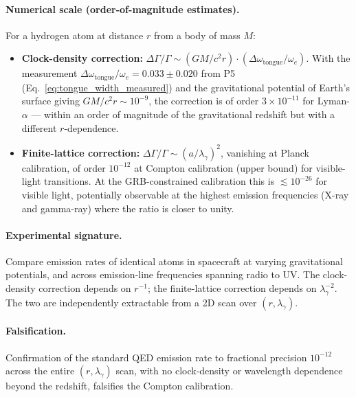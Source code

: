 \paragraph{Numerical scale (order-of-magnitude estimates).}
For a hydrogen atom at distance $r$ from a body of mass $M$:

\begin{itemize}
    \item \textbf{Clock-density correction:}
    $\Delta\Gamma/\Gamma \sim (GM/c^2 r) \cdot (\Delta\omega_\text{tongue}/\omega_e)$.
    With the measurement
    $\Delta\omega_\text{tongue}/\omega_e = 0.033 \pm 0.020$ from P5
    (Eq.~\ref{eq:tongue_width_measured}) and the gravitational
    potential of Earth's surface giving $GM/c^2 r \sim 10^{-9}$, the
    correction is of order $3 \times 10^{-11}$ for Lyman-$\alpha$ ---
    within an order of magnitude of the gravitational redshift but
    with a different $r$-dependence.
    \item \textbf{Finite-lattice correction:}
    $\Delta\Gamma/\Gamma \sim (a/\lambda_\gamma)^2$, vanishing at
    Planck calibration, of order $10^{-12}$ at Compton calibration
    (upper bound) for visible-light transitions. At the
    GRB-constrained calibration this is $\lesssim 10^{-26}$ for
    visible light, potentially observable at the highest emission
    frequencies (X-ray and gamma-ray) where the ratio is closer to
    unity.
\end{itemize}

\paragraph{Experimental signature.}
Compare emission rates of identical atoms in spacecraft at varying
gravitational potentials, and across emission-line frequencies
spanning radio to UV. The clock-density correction depends on
$r^{-1}$; the finite-lattice correction depends on
$\lambda_\gamma^{-2}$. The two are independently extractable from a
2D scan over $(r, \lambda_\gamma)$.

\paragraph{Falsification.}
Confirmation of the standard QED emission rate to fractional
precision $10^{-12}$ across the entire $(r, \lambda_\gamma)$ scan,
with no clock-density or wavelength dependence beyond the redshift,
falsifies the Compton calibration.

